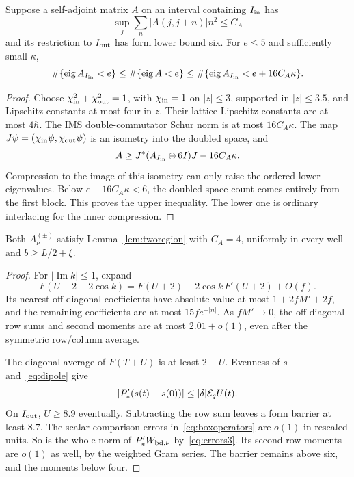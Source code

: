 \begin{lemma}\label{lem:tworegion}
Suppose a self-adjoint matrix $A$ on an interval containing $I_{\rm in}$ has
\[
 \sup_j\sum_n|A(j,j+n)|n^2\le C_A
\]
and its restriction to $I_{\rm out}$ has form lower bound six. For $e\le5$ and sufficiently small $\kappa$,
\begin{equation}\label{eq:tworegion}
 \#\{\operatorname{eig}A_{I_{\rm in}}<e\}
 \le\#\{\operatorname{eig}A<e\}
 \le\#\{\operatorname{eig}A_{I_{\rm in}}<e+16C_A\kappa\}.
\end{equation}
\end{lemma}
\begin{proof}
Choose $\chi_{\rm in}^2+\chi_{\rm out}^2=1$, with $\chi_{\rm in}=1$ on $|z|\le3$, supported in $|z|\le3.5$, and Lipschitz constants at most four in $z$. Their lattice Lipschitz constants are at most $4\hbar$. The IMS double-commutator Schur norm is at most $16C_A\kappa$. The map $J\psi=(\chi_{\rm in}\psi,\chi_{\rm out}\psi)$ is an isometry into the doubled space, and
\[
 A\ge J^*(A_{I_{\rm in}}\oplus6I)J-16C_A\kappa.
\]
Compression to the image of this isometry can only raise the ordered lower eigenvalues. Below $e+16C_A\kappa<6$, the doubled-space count comes entirely from the first block. This proves the upper inequality. The lower one is ordinary interlacing for the inner compression.
\end{proof}

\begin{lemma}\label{lem:far}
Both $A_\nu^{(\pm)}$ satisfy Lemma~\ref{lem:tworegion} with $C_A=4$, uniformly in every well and $b\ge L/2+\xi$.
\end{lemma}
\begin{proof}
For $|\operatorname{Im}k|\le1$, expand
\[
 F(U+2-2\cos k)=F(U+2)-2\cos k\,F'(U+2)+O(f).
\]
Its nearest off-diagonal coefficients have absolute value at most $1+2fM'+2f$, and the remaining coefficients are at most $15fe^{-|n|}$. As $fM'\to0$, the off-diagonal row sums and second moments are at most $2.01+o(1)$, even after the symmetric row/column average.

The diagonal average of $F(T+U)$ is at least $2+U$. Evenness of $s$ and~\eqref{eq:dipole} give
\begin{equation}\label{eq:dipolerelative}
 |P_*'(s(t)-s(0))|\le|\delta|\mathcal E_q U(t).
\end{equation}
On $I_{\rm out}$, $U\ge8.9$ eventually. Subtracting the row sum leaves a form barrier at least $8.7$. The scalar comparison errors in~\eqref{eq:boxoperators} are $o(1)$ in rescaled units. So is the whole norm of $P_*'W_{{\rm bd},\nu}$ by~\eqref{eq:errors3}. Its second row moments are $o(1)$ as well, by the weighted Gram series. The barrier remains above six, and the moments below four.
\end{proof}

